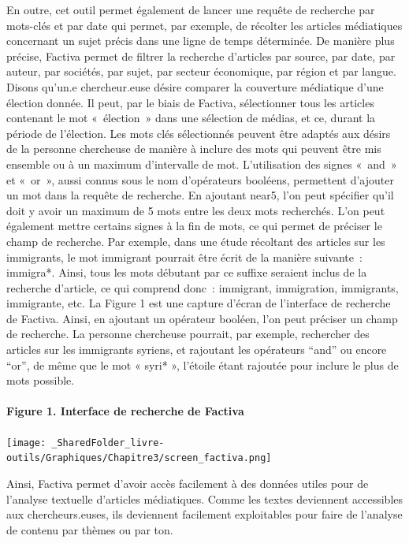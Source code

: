 \documentclass[
  letterpaper,
]{scrbook}
\let\oldparagraph\paragraph
\renewcommand{\paragraph}[1]{\oldparagraph{#1}\mbox{}}
\begin{document}
En outre, cet outil permet également de lancer une requête de recherche
par mots-clés et par date qui permet, par exemple, de récolter les
articles médiatiques concernant un sujet précis dans une ligne de temps
déterminée. De manière plus précise, Factiva permet de filtrer la
recherche d'articles par source, par date, par auteur, par sociétés, par
sujet, par secteur économique, par région et par langue. Disons qu'un.e
chercheur.euse désire comparer la couverture médiatique d'une élection
donnée. Il peut, par le biais de Factiva, sélectionner tous les articles
contenant le mot «~élection~» dans une sélection de médias, et ce,
durant la période de l'élection. Les mots clés sélectionnés peuvent être
adaptés aux désirs de la personne chercheuse de manière à inclure des
mots qui peuvent être mis ensemble ou à un maximum d'intervalle de mot.
L'utilisation des signes «~and~» et «~or~», aussi connus sous le nom
d'opérateurs booléens, permettent d'ajouter un mot dans la requête de
recherche. En ajoutant near5, l'on peut spécifier qu'il doit y avoir un
maximum de 5 mots entre les deux mots recherchés. L'on peut également
mettre certains signes à la fin de mots, ce qui permet de préciser le
champ de recherche. Par exemple, dans une étude récoltant des articles
sur les immigrants, le mot immigrant pourrait être écrit de la manière
suivante~: immigra*. Ainsi, tous les mots débutant par ce suffixe
seraient inclus de la recherche d'article, ce qui comprend donc~:
immigrant, immigration, immigrants, immigrante, etc. La Figure 1 est une
capture d'écran de l'interface de recherche de Factiva. Ainsi, en
ajoutant un opérateur booléen, l'on peut préciser un champ de recherche.
La personne chercheuse pourrait, par exemple, rechercher des articles
sur les immigrants syriens, et rajoutant les opérateurs ``and'' ou
encore ``or'', de même que le mot « syri* », l'étoile étant rajoutée
pour inclure le plus de mots possible.

\hypertarget{figure-1.-interface-de-recherche-de-factiva}{%
\paragraph{Figure 1. Interface de recherche de
Factiva}\label{figure-1.-interface-de-recherche-de-factiva}}

\texttt{[image: \_SharedFolder\_livre-outils/Graphiques/Chapitre3/screen\_factiva.png]}

Ainsi, Factiva permet d'avoir accès facilement à des données utiles pour
de l'analyse textuelle d'articles médiatiques. Comme les textes
deviennent accessibles aux chercheurs.euses, ils deviennent facilement
exploitables pour faire de l'analyse de contenu par thèmes ou par ton.
\end{document}
